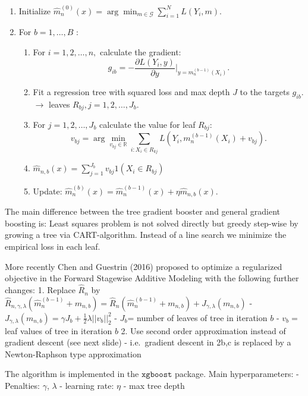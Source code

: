 \documentclass[
]{book}
\providecommand{\tightlist}{%
  \setlength{\itemsep}{0pt}\setlength{\parskip}{0pt}}
\begin{document}
\begin{enumerate}
\def\labelenumi{\arabic{enumi}.}
\tightlist
\item
  Initialize \(\hat m_{n}^{(0)}(x)=\arg \min_{m \in \mathcal G} \sum_{i=1}^N L\left(Y_i, m\right)\).
\item
  For \(b=1,\dots,B\) :

  \begin{enumerate}
  \def\labelenumii{(\alph{enumii})}
  \tightlist
  \item
    For \(i=1,2, \ldots, n,\) calculate the gradient:
    \[
    g_{ib}=-\frac{\partial L(Y_i,y)}{\partial y} \Bigr\rvert_{y=m_n^{(b-1)}(X_i)} .
    \]
  \item
    Fit a regression tree with squared loss and max depth \(J\) to the targets \(g_{ib}\). \(\rightarrow\) leaves \(R_{bj}, j=1,2, \ldots, J_b\).
  \item
    For \(j=1,2, \ldots, J_b\) calculate the value for leaf \(R_{bj}\):
    \[
    v_{bj}=\arg \min_{ v_{bj} \in \mathbb R} \sum_{i: X_i \in R_{kj}} L\left(Y_i, m_n^{(b-1)}(X_i)+ v_{bj}\right) .
    \]
  \item
    \(\hat m_{n,b}(x)=\sum_{j=1}^{J_b} v_{bj} 1\left(X_i \in R_{b j}\right)\)
  \item
    Update: \(\hat m^{(b)}_n(x)=\hat m^{(b-1)}_n(x)+ \eta \hat m_{n,b}(x)\).
  \end{enumerate}
\end{enumerate}

The main difference between the tree gradient booster and general gradient boosting is: Least squares problem is not solved directly but greedy step-wise by growing a tree via CART-algorithm. Instead of a line search we minimize the empirical loss in each leaf.

More recently Chen and Guestrin (2016) proposed to optimize a regularized objective in the Forward Stagewise Additive Modeling with the following further changes:
1. Replace \(\hat R_n\) by \(\hat R_{n,\gamma,\lambda}(\hat m_n^{(b-1)}+m_{n,b}) =\hat R_n(\hat m_n^{(b-1)}+m_{n,b}) + J_{\gamma,\lambda}(m_{n,b})\)
- \(J_{\gamma,\lambda}(m_{n,b})= \gamma J_b+ \frac 1 2 \lambda ||v_b||_2^2\)
- \(J_b\)= number of leaves of tree in iteration \(b\)
- \(v_b=\) leaf values of tree in iteration \(b\)
2. Use second order approximation instead of gradient descent (see next slide)
- i.e.~gradient descent in 2b,c is replaced by a Newton-Raphson type approximation

The algorithm is implemented in the \(\texttt{xgboost}\) package. Main hyperparameters:
- Penalties: \(\gamma\), \(\lambda\)
- learning rate: \(\eta\)
- max tree depth
\end{document}
